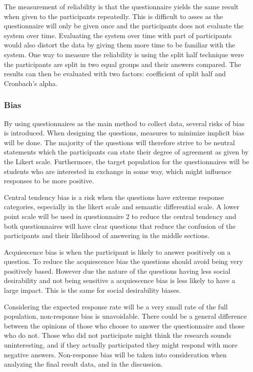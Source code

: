 The measurement of reliability is that the questionnaire yields the same result when given to the participants repeatedly. This is difficult to asses as the questionnaire will only be given once and the participants does not evaluate the system over time. Evaluating the system over time with part of participants would also distort the data by giving them more time to be familiar with the system. One way to measure the reliability is using the split half technique were the participants are split in two equal groups and their answers compared. The results can then be evaluated with two factors: coefficient of split half and Cronbach's alpha.

\subsubsection{Bias}

By using questionnaires as the main method to collect data, several risks of bias is introduced. When designing the questions, measures to minimize implicit bias will be done. The majority of the questions will therefore strive to be neutral statements which the participants can state their degree of agreement as given by the Likert scale\cite{allen2007likert}. Furthermore, the target population for the questionnaires will be students who are interested in exchange in some way, which might influence responses to be more positive. 

Central tendency bias is a risk when the questions have extreme response categories, especially in the likert scale and semantic differential scale. A lower point scale will be used in questionnaire 2 to reduce the central tendency and both questionnaires will have clear questions that reduce the confusion of the participants and their likelihood of answering in the middle sections. 

Acquiescence bias is when the participant is likely to answer positively on a question. To reduce the acquiescence bias the questions should avoid being very positively based. However due the nature of the questions having less social desirability and not being sensitive a acquiescence bias is less likely to have a large impact. This is the same for social desirability biases.  

Considering the expected response rate will be a very small rate of the full population, non-response bias is unavoidable. There could be a general difference between the opinions of those who choose to answer the questionnaire and those who do not. Those who did not participate might think the research sounds uninteresting, and if they actually participated they might respond with more negative answers. Non-response bias will be taken into consideration when analyzing the final result data, and in the discussion.



